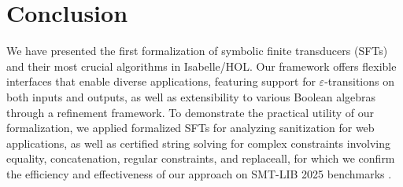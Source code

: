 \section{Conclusion}
\label{sec:conclusion}

We have presented the first formalization of symbolic finite transducers (SFTs)
and their most crucial algorithms in Isabelle/HOL. Our framework offers 
flexible interfaces that enable diverse applications, featuring support for 
$\varepsilon$-transitions on both inputs and outputs, as well as extensibility to various Boolean algebras through a refinement framework.
To demonstrate the practical utility of our formalization, we applied formalized
SFTs for analyzing sanitization for web applications, as well as certified 
string solving for complex constraints involving equality, concatenation,
regular constraints, and replaceall, for which we confirm the efficiency
and effectiveness of our approach on SMT-LIB 2025 benchmarks
\cite{smtlib_benchmarks}.

